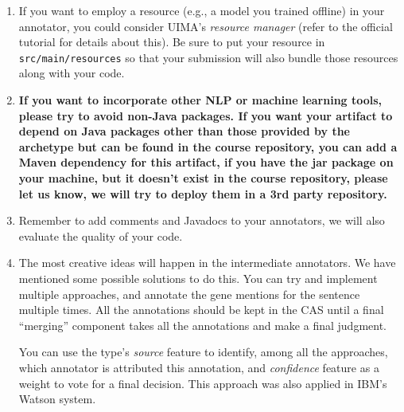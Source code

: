 \begin{enumerate}

\item If you want to employ a resource (e.g., a model you trained offline) in
your annotator, you could consider UIMA's \emph{resource manager} (refer to the
official tutorial for details about this).
Be sure to put your resource in \texttt{src/main/resources} so that your
submission will also bundle those resources along with your code.

\item \textbf{If you want to incorporate other NLP or machine learning tools,
please try to avoid non-Java packages. If you want your artifact to depend on
Java packages other than those provided by the archetype but can be found
in the course repository, you can add a Maven dependency for this artifact, if
you have the jar package on your machine, but it doesn't exist in the course
repository, please let us know, we will try to deploy them in a 3rd party
repository.}

\item Remember to add comments and Javadocs to your annotators, we will also
evaluate the quality of your code.

\item The most creative ideas will happen in the intermediate annotators. We
have mentioned some possible solutions to do this. You can try and implement
multiple approaches, and annotate the gene mentions for the sentence multiple
times. All the annotations should be kept in the CAS until a final ``merging''
component takes all the annotations and make a final judgment.

You can use the type's \emph{source} feature to identify, among all the
approaches, which annotator is attributed this annotation, and \emph{confidence}
feature as a weight to vote for a final decision. This approach was also applied
in IBM's Watson system.

\end{enumerate}
